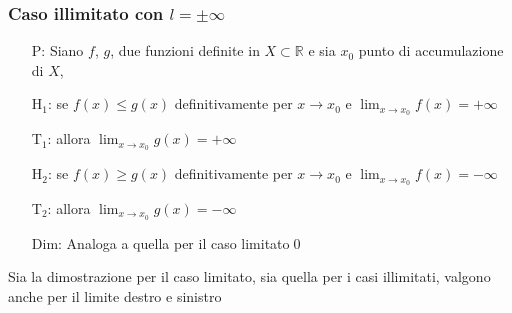 \documentclass[a4paper]{article}
\begin{document}
\subsubsection*{Caso illimitato con \(l = \pm \infty\)}
\begin{itemize}
	\item[P: ] Siano \(f\), \(g\), due funzioni definite in \(X \subset \mathbb{R}\) e sia \(x_0\) punto di accumulazione di \(X\),
	\item[H\(_1\): ] se \(f(x) \leq g(x)\) definitivamente per \(x \to x_0\) e \(\displaystyle \lim_{x \to x_0} f(x) = + \infty\)
	\item[T\(_1\): ] allora \(\displaystyle \lim_{x \to x_0} g(x) = + \infty\)
	\item[H\(_2\): ] se \(f(x) \geq g(x)\) definitivamente per \(x \to x_0\) e \(\displaystyle \lim_{x \to x_0} f(x) = - \infty\)
	\item[T\(_2\): ] allora \(\displaystyle \lim_{x \to x_0} g(x) = - \infty\)
	\item[Dim: ] Analoga a quella per il caso limitato\qed
\end{itemize}

Sia la dimostrazione per il caso limitato, sia quella per i casi illimitati, valgono anche per il limite destro e sinistro
\end{document}
